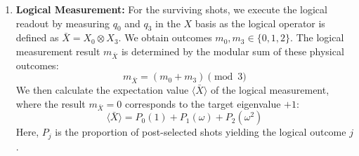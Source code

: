 \begin{enumerate}
    \textit{Simulation: In the numerical simulation of the syndrome extraction, we model interaction errors by applying a two-qutrit depolarizing channel, $\mathcal{E}^{(2)}_{\mathcal{D}}$, immediately following every two-qudit gate (generalized $CX$ or $CX^\dagger$) interacting the ancilla and data qutrits. This channel is defined as:
    \begin{equation}
        \mathcal{E}^{(2)}_{\mathcal{D}}(\rho) = (1-p_{2q})\rho + \frac{p_{2q}}{9}I
    \end{equation}
    where $p_{2q}$ is the two-qutrit error probability and $I$ is the identity on the 9-dimensional Hilbert space. Furthermore, we apply single-qutrit depolarizing noise $\mathcal{E}_{\mathcal{D}}$ to the ancilla qutrits immediately following the Hadamard gates ($H_3, H_3^{-1}$) in the $X$-type stabilizer circuits, as illustrated in \autoref{fig:lrb_d}.}
    
    
    \item \textbf{Logical Measurement:} For the surviving shots, we execute the logical readout by measuring $q_0$ and $q_3$ in the $X$ basis as the logical operator is defined as $\bar{X} = X_0 \otimes X_3$. We obtain outcomes $m_0, m_3 \in \{0, 1, 2\}$. The logical measurement result $m_{\bar{X}}$ is determined by the modular sum of these physical outcomes:
    \begin{equation}
        m_{\bar{X}} = (m_0 + m_3) \pmod 3
    \end{equation}
    We then calculate the expectation value $\langle \bar{X} \rangle$ of the logical measurement, where the result $m_{\bar{X}}=0$ corresponds to the target eigenvalue $+1$:
    \begin{equation}
        \langle \bar{X} \rangle = P_0(1) + P_1(\omega) + P_2(\omega^2)
    \end{equation}
    Here, $P_j$ is the proportion of post-selected shots yielding the logical outcome $j$.
\end{enumerate}
